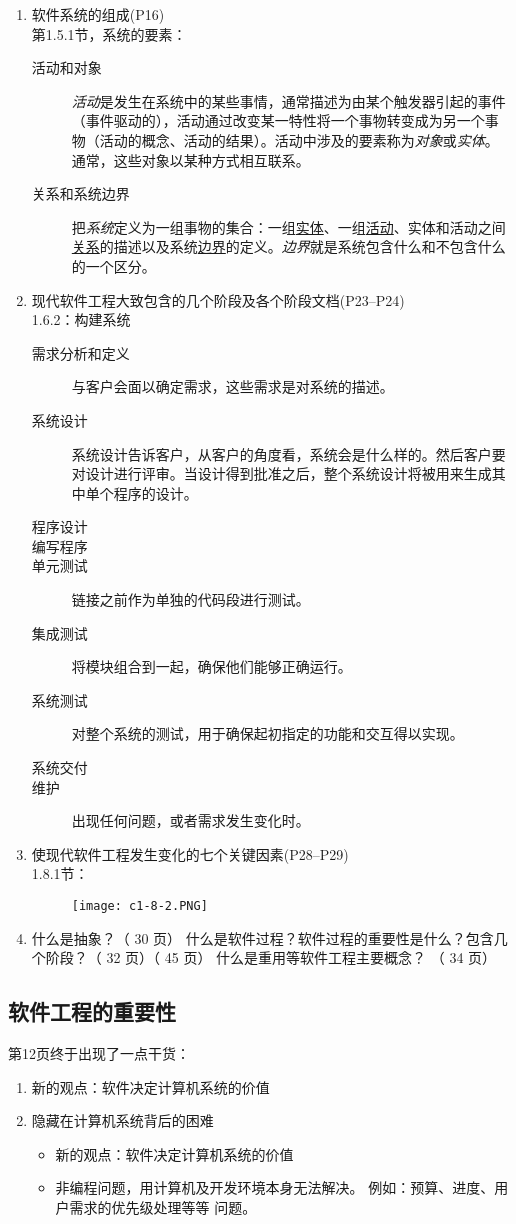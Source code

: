 \documentclass[14pt, letterpaper, UTF8, fontset=windowsnew, heading=true]{article}
\begin{document}
\begin{enumerate}
	\item 软件系统的组成(P16) \\
	第1.5.1节，系统的要素：
	\begin{description}
		\item[活动和对象] \emph{活动}是发生在系统中的某些事情，通常描述为由某个触发器引起的事件（事件驱动的），活动通过改变某一特性将一个事物转变成为另一个事物（活动的概念、活动的结果）。活动中涉及的要素称为\emph{对象}或\emph{实体}。通常，这些对象以某种方式相互联系。
		\item[关系和系统边界] 把\emph{系统}定义为一组事物的集合：一组\underline{实体}、一组\underline{活动}、实体和活动之间\underline{关系}的描述以及系统\underline{边界}的定义。\emph{边界}就是系统包含什么和不包含什么的一个区分。
	\end{description}

	\item 现代软件工程大致包含的几个阶段及各个阶段文档(P23--P24) \\
	1.6.2：构建系统
	\begin{description}
		\item[需求分析和定义] 与客户会面以确定需求，这些需求是对系统的描述。
		\item[系统设计] 系统设计告诉客户，从客户的角度看，系统会是什么样的。然后客户要对设计进行评审。当设计得到批准之后，整个系统设计将被用来生成其中单个程序的设计。
		\item[程序设计] 
		\item[编写程序]
		\item[单元测试] 链接之前作为单独的代码段进行测试。
		\item[集成测试] 将模块组合到一起，确保他们能够正确运行。
		\item[系统测试] 对整个系统的测试，用于确保起初指定的功能和交互得以实现。
		\item[系统交付] 
		\item[维护] 出现任何问题，或者需求发生变化时。
	\end{description}

	\item 
	使现代软件工程发生变化的七个关键因素(P28--P29)
	\\ 1.8.1节：
	\begin{figure}[h]
		\centering
		\texttt{[image: c1-8-2.PNG]}
	\end{figure}

	\item
	什么是抽象？（ 30 页）
	什么是软件过程？软件过程的重要性是什么？包含几个阶段？（ 32 页）（ 45 页）
	什么是重用等软件工程主要概念？ （ 34 页）
\end{enumerate}

\subsection{软件工程的重要性}
第12页终于出现了一点干货：
\begin{enumerate}
	\item 新的观点：软件决定计算机系统的价值
	\item 隐藏在计算机系统背后的困难
	\begin{itemize}
		\item 新的观点：软件决定计算机系统的价值
		\item 
		非编程问题，用计算机及开发环境本身无法解决。
		例如：预算、进度、用户需求的优先级处理等等
		问题。
	\end{itemize}
\end{enumerate}
\end{document}
